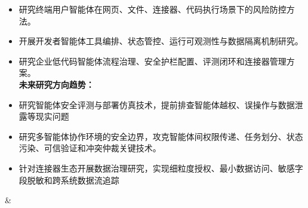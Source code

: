 \begin{longtblr}[
  caption = {北美主流AI智能体安全产品与落地方向},
  label   = {tab:north-america-agent-security-products},
]
    \begin{itemize}[leftmargin=*,topsep=0pt,partopsep=0pt,itemsep=1pt,parsep=0pt]
    \item 研究终端用户智能体在网页、文件、连接器、代码执行场景下的风险防控方法。
    \item 开展开发者智能体工具编排、状态管控、运行可观测性与数据隔离机制研究。
    \item 研究企业低代码智能体流程治理、安全护栏配置、评测闭环和连接器管理方案。\\
    \textbf{未来研究方向趋势：}
    \item 研究智能体安全评测与部署仿真技术，提前排查智能体越权、误操作与数据泄露等现实问题~\cite{openaideploymentsimulation2026}
    \item 研究多智能体协作环境的安全边界，攻克智能体间权限传递、任务划分、状态污染、可信验证和冲突仲裁关键技术。~\cite {openaitoolsagents2025,xu2025trustparadox}
    \item 针对连接器生态开展数据治理研究，实现细粒度授权、最小数据访问、敏感字段脱敏和跨系统数据流追踪~\cite {openaiagentkit2025,hou2025mcp,wang2025mcptox}
    \end{itemize}
& 
    \begin{itemize}[leftmargin=*,topsep=0pt,partopsep=0pt,itemsep=1pt,parsep=0pt]

\end{itemize}
\end{longtblr}
